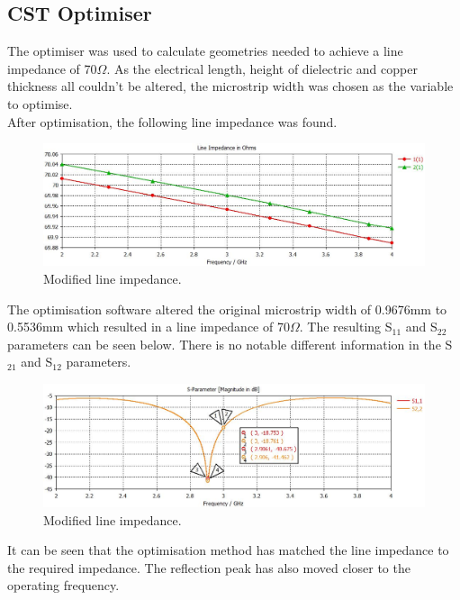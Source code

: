 \documentclass{paper}
\begin{document}
\newpage
\subsection{CST Optimiser}
The optimiser was used to calculate geometries needed to achieve a line impedance of 70$\Omega$. As the electrical length, height of dielectric and copper thickness all couldn't be altered, the microstrip width was chosen as the variable to optimise.\\

After optimisation, the following line impedance was found.\\

\begin{figure}[H]
	\centering
	\includegraphics[scale=0.4]{IMG/70ohm}
	\caption{Modified line impedance.}
	\label{fig:mod_line_imp}
\end{figure}

The optimisation software altered the original microstrip width of 0.9676mm to 0.5536mm which resulted in a line impedance of 70$\Omega$. The resulting S$_{11}$ and S$_{22}$ parameters can be seen below. There is no notable different information in the S$_{21}$ and S$_{12}$ parameters.

\begin{figure}[H]
	\centering
	\includegraphics[scale=0.4]{IMG/70ohm_s11_s22}
	\caption{Modified line impedance.}
	\label{fig:mod_line_s11_s22}
\end{figure}

It can be seen that the optimisation method has matched the line impedance to the required impedance. The reflection peak has also moved closer to the operating frequency.
\end{document}
